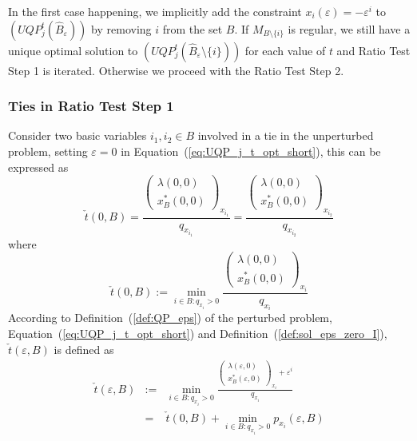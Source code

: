 \documentclass[a4paper]{article}
\begin{document}
In the first case happening, we implicitly add the constraint
$x_{i}(\varepsilon)=-\varepsilon^{i}$
to $(UQP_{j}^{t}(\hat{B}_{\varepsilon}))$ by removing $i$ from the set $B$.
If $M_{B \setminus \{i\}}$ is regular,
we still have a unique optimal solution to
$(UQP_{j}^{t}(\hat{B}_{\varepsilon} \setminus \{i\}))$ for each value of
$t$ and Ratio Test Step 1 is
iterated. Otherwise we proceed with the Ratio Test Step 2.

 
\subsubsection{Ties in Ratio Test Step 1}
\label{sec:Ties_ratio_test_step_1}
Consider two basic variables $i_{1}, i_{2} \in B$ involved in a tie in the
unperturbed problem, setting $\varepsilon=0$ in
Equation~(\ref{eq:UQP_j_t_opt_short}), this can be expressed as
\begin{equation}
\check{t}\left(0, B\right)=
\frac{\left(\begin{array}{c}
              \lambda\left(0, 0 \right) \\
              \hline
               x_{B}^{*}\left(0, 0\right)
            \end{array}
      \right)_{x_{i_{1}}}}{q_{x_{i_{1}}}}
=
\frac{\left(\begin{array}{c}
              \lambda\left(0, 0 \right) \\
              \hline
              x_{B}^{*}\left(0, 0\right) 
            \end{array}
       \right)_{x_{i_{2}}}}{q_{x_{i_{2}}}}
\end{equation}
where
\begin{equation}
\check{t}\left(0, B\right):=\min_{i \in B: q_{x_{i}} > 0}
\frac{\left(\begin{array}{c}
               \lambda\left(0, 0\right) \\
               \hline
               x_{B}^{*}\left(0, 0\right)
            \end{array}
       \right)_{x_{i}}}{q_{x_{i}}}
\end{equation}
According to Definition~(\ref{def:QP_eps}) of the perturbed problem,
Equation~(\ref{eq:UQP_j_t_opt_short}) and
Definition~(\ref{def:sol_eps_zero_I}),
$\check{t}(\varepsilon, B)$
is defined as
\begin{eqnarray}
\label{def:t_min_eps}
\check{t}\left(\varepsilon, B\right) & := &
  \min_{i \in B: q_{x_{i}} > 0}
  \frac{\left(\begin{array}{c}
                \lambda\left(\varepsilon, 0 \right) \\
	        \hline
	        x_{B}^{*}\left(\varepsilon, 0 \right)
	      \end{array}
        \right)_{x_{i}}+ \varepsilon^{i}}{q_{x_{i}}} \\
  &=&
    \check{t}\left(0, B \right) +
  \min_{i \in B: q_{x_{i}} > 0} p_{x_{i}}\left(\varepsilon, B\right)
\end{eqnarray}
\end{document}
